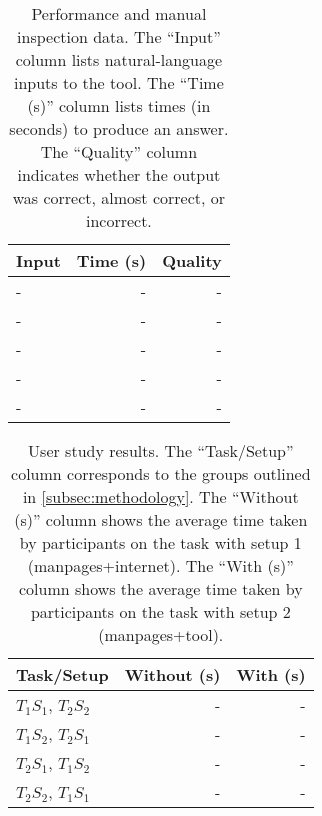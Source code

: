 \begin{table}
    \begin{center}
    \begin{tabular}{lrr}
        \textbf{Input} & \textbf{Time (s)} & \textbf{Quality} \\
        \hline
        - & - & - \\
        - & - & - \\
        - & - & - \\
        - & - & - \\
        - & - & - \\
    \end{tabular}
    \end{center}
    \caption{Performance and manual inspection data. The ``Input'' column lists
        natural-language inputs to the tool. The ``Time (s)'' column lists times
        (in seconds) to produce an answer. The ``Quality'' column indicates
        whether the output was correct, almost correct, or incorrect.}
\end{table}

\begin{table}
    \begin{center}
    \begin{tabular}{lrr}
        \textbf{Task/Setup} & \textbf{Without (s)} & \textbf{With (s)} \\
        \hline
        $T_1 S_1$, $T_2 S_2$ & - & - \\
        $T_1 S_2$, $T_2 S_1$ & - & - \\
        $T_2 S_1$, $T_1 S_2$ & - & - \\
        $T_2 S_2$, $T_1 S_1$ & - & - \\
    \end{tabular}
    \end{center}
    \caption{User study results. The ``Task/Setup'' column corresponds to the
        groups outlined in \autoref{subsec:methodology}. The ``Without (s)''
        column shows the average time taken by participants on the task with
        setup 1 (manpages+internet). The ``With (s)'' column shows the average
        time taken by participants on the task with setup 2 (manpages+tool).}
\end{table}

